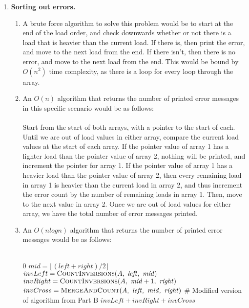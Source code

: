 \documentclass{article}
\begin{document}
\begin{enumerate}
\begin{enumerate}
    \end{enumerate}

    \item \textbf{Sorting out errors.}
    \begin{enumerate}
        \item A brute force algorithm to solve this problem would be to start at the end of the load order, and check downwards whether or not there is a load that is heavier than the current load. If there is, then print the error, and move to the next load from the end. If there isn't, then there is no error, and move to the next load from the end. This would be bound by $O(n^2)$ time complexity, as there is a loop for every loop through the array.
        \item An $O(n)$ algorithm that returns the number of printed error messages in this specific scenario would be as follows:
        \\\\
        Start from the start of both arrays, with a pointer to the start of each. Until we are out of load values in either array, compare the current load values at the start of each array. If the pointer value of array 1 has a lighter load than the pointer value of array 2, nothing will be printed, and increment the pointer for array 1. If the pointer value of array 1 has a heavier load than the pointer value of array 2, then every remaining load in array 1 is heavier than the current load in array 2, and thus increment the error count by the number of remaining loads in array 1. Then, move to the next value in array 2. Once we are out of load values for either array, we have the total number of error messages printed.
        \item An $O(n log n)$ algorithm that returns the number of printed error messages would be as follows:
        \\\\
        \begin{algorithm}
            \begin{algorithmic}[1]
                        \State \Return $0$ 
                    \EndIf
                    \State $\mathit{mid} = \lfloor (\mathit{left} + \mathit{right}) / 2 \rfloor$
                    \State $invLeft = \Call{CountInversions}{A,\ \mathit{left},\ \mathit{mid}}$
                    \State $invRight = \Call{CountInversions}{A,\ \mathit{mid} + 1,\ \mathit{right}}$
                    \State $invCross = \Call{MergeAndCount}{A,\ \mathit{left},\ \mathit{mid},\ \mathit{right}}$
                        \# Modified version of algorithm from Part B
                    \State \Return $invLeft + invRight + invCross$
                \EndFunction
        

\end{algorithmic}
\end{algorithm}
\end{enumerate}
\end{enumerate}
\end{document}
